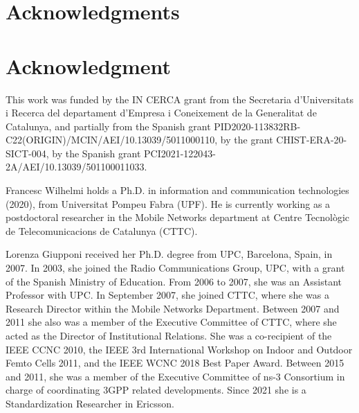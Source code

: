 \documentclass[lettersize,journal]{IEEEtran}
\begin{document}
\ifCLASSOPTIONcompsoc
  \section*{Acknowledgments}
\else
  \section*{Acknowledgment}
\fi

This work was funded by the IN CERCA grant from the Secretaria d'Universitats i Recerca del departament d'Empresa i Coneixement de la Generalitat de Catalunya, and partially from the Spanish grant PID2020-113832RB-C22(ORIGIN)/MCIN/AEI/10.13039/5011000110, by the grant CHIST-ERA-20-SICT-004, by the Spanish grant PCI2021-122043-2A/AEI/10.13039/501100011033. 

\ifCLASSOPTIONcaptionsoff
  \newpage
\fi




\vspace{-1cm}
\begin{IEEEbiography}{Francesc Wilhelmi}
holds a Ph.D. in information and communication technologies (2020), from Universitat Pompeu Fabra (UPF). He is currently working as a postdoctoral researcher in the Mobile Networks department at Centre Tecnològic de Telecomunicacions de Catalunya (CTTC). 
\end{IEEEbiography}

\vspace{-1cm}
\begin{IEEEbiography}{Lorenza Giupponi} received her Ph.D. degree from UPC, Barcelona, Spain, in 2007. In 2003, she joined the Radio Communications Group, UPC, with a grant of the Spanish Ministry of  Education. From 2006 to 2007, she was an Assistant Professor with UPC. In September 2007, she joined CTTC, where she was a Research Director within the Mobile Networks Department. Between 2007 and 2011 she also was a member of the Executive Committee of CTTC, where she acted as the Director of Institutional Relations. She was a co-recipient of the IEEE CCNC 2010, the IEEE 3rd International Workshop on Indoor and Outdoor Femto Cells 2011, and the IEEE WCNC 2018 Best Paper Award. Between 2015 and 2011, she was a member of the Executive Committee of ns-3 Consortium in charge of coordinating 3GPP related developments. Since 2021 she is a Standardization Researcher in Ericsson.
\end{IEEEbiography}
\end{document}
